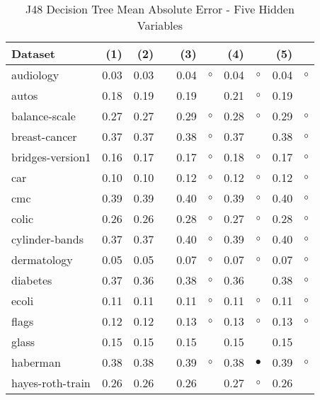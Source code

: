 \newpage
{\centering \footnotesize \begin{longtable}{lrr@{\hspace{0.1cm}}cr@{\hspace{0.1cm}}cr@{\hspace{0.1cm}}cr@{\hspace{0.1cm}}c}
\caption{\label{j48mae5}J48 Decision Tree Mean Absolute Error - Five Hidden Variables}
\\
\hline
Dataset & (1)& (2) & & (3) & & (4) & & (5) & \\
\hline
audiology & 0.03 & 0.03 &           & 0.04 &   $\circ$ & 0.04 &   $\circ$ & 0.04 &   $\circ$\\
autos & 0.18 & 0.19 &           & 0.19 &           & 0.21 &   $\circ$ & 0.19 &          \\
balance-scale & 0.27 & 0.27 &           & 0.29 &   $\circ$ & 0.28 &   $\circ$ & 0.29 &   $\circ$\\
breast-cancer & 0.37 & 0.37 &           & 0.38 &   $\circ$ & 0.37 &           & 0.38 &   $\circ$\\
bridges-version1 & 0.16 & 0.17 &           & 0.17 &   $\circ$ & 0.18 &   $\circ$ & 0.17 &   $\circ$\\
car & 0.10 & 0.10 &           & 0.12 &   $\circ$ & 0.12 &   $\circ$ & 0.12 &   $\circ$\\
cmc & 0.39 & 0.39 &           & 0.40 &   $\circ$ & 0.39 &   $\circ$ & 0.40 &   $\circ$\\
colic & 0.26 & 0.26 &           & 0.28 &   $\circ$ & 0.27 &   $\circ$ & 0.28 &   $\circ$\\
cylinder-bands & 0.37 & 0.37 &           & 0.40 &   $\circ$ & 0.39 &   $\circ$ & 0.40 &   $\circ$\\
dermatology & 0.05 & 0.05 &           & 0.07 &   $\circ$ & 0.07 &   $\circ$ & 0.07 &   $\circ$\\
diabetes & 0.37 & 0.36 &           & 0.38 &   $\circ$ & 0.36 &           & 0.38 &   $\circ$\\
ecoli & 0.11 & 0.11 &           & 0.11 &   $\circ$ & 0.11 &   $\circ$ & 0.11 &   $\circ$\\
flags & 0.12 & 0.12 &           & 0.13 &   $\circ$ & 0.13 &   $\circ$ & 0.13 &   $\circ$\\
glass & 0.15 & 0.15 &           & 0.15 &           & 0.15 &           & 0.15 &          \\
haberman & 0.38 & 0.38 &           & 0.39 &   $\circ$ & 0.38 & $\bullet$ & 0.39 &   $\circ$\\
hayes-roth-train & 0.26 & 0.26 &           & 0.26 &           & 0.27 &   $\circ$ & 0.26 &          \\

\end{longtable}}
